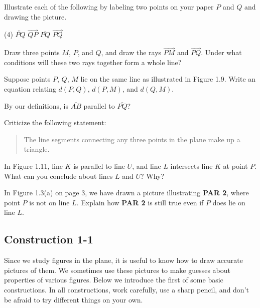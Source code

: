 \documentclass[12pt]{book} %
\begin{document}
\begin{ExerciseList}
	\Exercise Illustrate each of the following by labeling two points on your paper $P$ and $Q$ and drawing the picture.
	\begin{tasks}(4)
		\task $\overleftrightarrow{PQ}$
		\task $\overrightarrow{QP}$
		\task $\overline{PQ}$
		\task $\overrightarrow{PQ}$
	\end{tasks}
	
	\Exercise Draw three points $M$, $P$, and $Q$, and draw the rays $\overrightarrow{PM}$ and $\overrightarrow{PQ}$. Under what conditions will these two rays together form a whole line?
	
	\Exercise Suppose points $P$, $Q$, $M$ lie on the same line as illustrated in Figure 1.9. Write an equation relating $d(P,Q)$, $d(P,M)$, and $d(Q,M)$.
	
	
	\Exercise By our definitions, is $\overline{AB}$ parallel to $\overline{PQ}$?
	
	
	\Exercise Criticize the following statement:
	
	\begin{quote}
		The line segments connecting any three points in the plane make up a triangle.
	\end{quote}
	
	\Exercise In Figure 1.11, line $K$ is parallel to line $U$, and line $L$ intersects line $K$ at point $P$. What can you conclude about lines $L$ and $U$? Why?
	
	
	\Exercise In Figure 1.3(a) on page 3, we have drawn a picture illustrating \textbf{PAR 2}, where point $P$ is not on line $L$. Explain how \textbf{PAR 2} is still true even if $P$ does lie on line $L$.
\end{ExerciseList}

\subsection*{Construction 1-1}

Since we study figures in the plane, it is useful to know how to draw accurate pictures of them. We sometimes use these pictures to make guesses about properties of various figures. Below we introduce the first of some basic constructions. In all constructions, work carefully, use a sharp pencil, and don't be afraid to try different things on your own.
\end{document}
